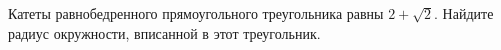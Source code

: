\begin{ex}
	\begin{condition}
		 Катеты равнобедренного прямоугольного треугольника равны \( 2+\sqrt{2} \). Найдите радиус окружности, вписанной в этот треугольник.
	\end{condition}
\end{ex}